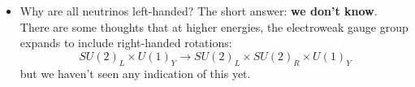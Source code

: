 \documentclass[12pt, oneside]{article}   	%
\theoremstyle{definition}
\begin{document}
\begin{itemize}
	
	
	\item Why are all neutrinos left-handed? The short answer: \textbf{we don't know}. There are some thoughts that at higher energies, the electroweak gauge group expands to include right-handed rotations:
	\begin{equation}
		SU(2)_L\times U(1)_Y\rightarrow SU(2)_L\times SU(2)_R\times U(1)_Y
	\end{equation}
	but we haven't seen any indication of this yet. 

\end{itemize}
\end{document}
